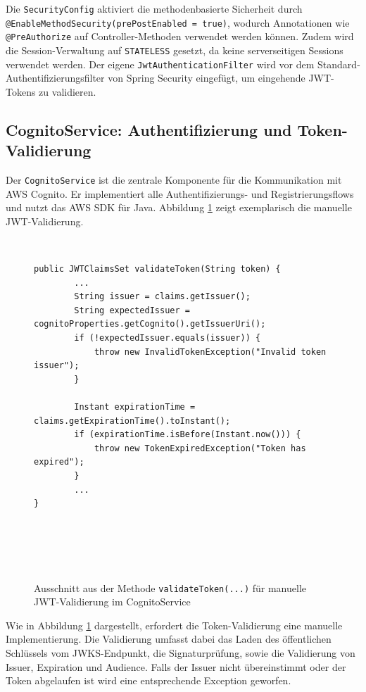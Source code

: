 Die \texttt{SecurityConfig} aktiviert die methodenbasierte Sicherheit durch \texttt{@EnableMethodSecurity(prePostEnabled = true)}, wodurch Annotationen wie \texttt{@PreAuthorize} auf Controller-Methoden verwendet werden können. Zudem wird die Session-Verwaltung auf \texttt{STATELESS} gesetzt, da keine serverseitigen Sessions verwendet werden. Der eigene \texttt{JwtAuthenticationFilter} wird vor dem Standard-Authentifizierungsfilter von Spring Security eingefügt, um eingehende \ac{JWT}-Tokens zu validieren.

\subsection{CognitoService: Authentifizierung und Token-Validierung}

Der \texttt{CognitoService} ist die zentrale Komponente für die Kommunikation mit \ac{AWS} Cognito. Er implementiert alle Authentifizierungs- und Registrierungsflows und nutzt das \ac{AWS} \ac{SDK} für Java. Abbildung \ref{fig:cognito_service} zeigt exemplarisch die manuelle \ac{JWT}-Validierung.

\begin{figure}[h]
    \begin{verbatim}
public JWTClaimsSet validateToken(String token) {
        ...
        String issuer = claims.getIssuer();
        String expectedIssuer = cognitoProperties.getCognito().getIssuerUri();
        if (!expectedIssuer.equals(issuer)) {
            throw new InvalidTokenException("Invalid token issuer");
        }

        Instant expirationTime = claims.getExpirationTime().toInstant();
        if (expirationTime.isBefore(Instant.now())) {
            throw new TokenExpiredException("Token has expired");
        }
        ...
}
    \end{verbatim}
    \caption{Ausschnitt aus der Methode \texttt{validateToken(...)} für manuelle JWT-Validierung im CognitoService}
    \label{fig:cognito_service}
\end{figure}

Wie in Abbildung \ref{fig:cognito_service} dargestellt, erfordert die Token-Validierung eine manuelle Implementierung. Die Validierung umfasst dabei das Laden des öffentlichen Schlüssels vom \ac{JWKS}-Endpunkt, die Signaturprüfung, sowie die Validierung von Issuer, Expiration und Audience. Falls der Issuer nicht übereinstimmt oder der Token abgelaufen ist wird eine entsprechende Exception geworfen.


